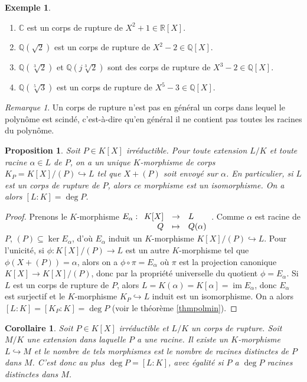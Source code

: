 \documentclass{article}
\newcommand{\Q}{\mathbb{Q}}
\newcommand{\R}{\mathbb{R}}
\newcommand{\C}{\mathbb{C}}
\DeclareMathOperator{\im}{im}
\newcommand{\applic}[4]{\begin{array}[t]{rcl}
#1 & \to & #2 \\
#3 & \mapsto & #4
\end{array}}
\renewcommand{\subset}{\subseteq}
\theoremstyle{plain}
\newtheorem{proposition}[theorem]{Proposition}
\newtheorem{corollary}[theorem]{Corollaire}
\theoremstyle{definition}
\newtheorem{example}[theorem]{Exemple}
\theoremstyle{remark}
\newtheorem*{remark}{Remarque}
\begin{document}
\begin{example} \leavevmode
    \begin{enumerate}
        \item $\C$ est un corps de rupture de $X^2 + 1 \in \R[X]$.
        \item $\Q(\sqrt{2})$ est un corps de rupture de $X^2 - 2 \in \Q[X]$.
        \item $\Q(\sqrt[3]{2})$ et $\Q(j\sqrt[3]{2})$ sont des corps de rupture de $X^3 - 2 \in \Q[X]$.
        \item $\Q(\sqrt[5]{3})$ est un corps de rupture de $X^5 - 3 \in \Q[X]$.
    \end{enumerate}
\end{example}

\begin{remark}
    Un corps de rupture n'est pas en général un corps dans lequel le polynôme est scindé, c'est-à-dire qu'en général il ne contient pas \og toutes \fg les racines du polynôme.
\end{remark}

\begin{proposition}
    Soit $P \in K[X]$ irréductible. Pour toute extension $L/K$ et toute racine $\alpha \in L$ de $P$, on a un unique $K$-morphisme de corps $K_P = K[X]/(P) \hookrightarrow L$ tel que $X + (P)$ soit envoyé sur $\alpha$. En particulier, si $L$ est un corps de rupture de $P$, alors ce morphisme est un isomorphisme. On a alors $[L : K] = \deg P$.
\end{proposition}

\begin{proof}
    Prenons le $K$-morphisme $E_\alpha : \applic{K[X]}{L}{Q}{Q(\alpha)}$. Comme $\alpha$ est racine de $P$, $(P) \subset \ker E_\alpha$, d'où $E_\alpha$ induit un $K$-morphisme $K[X]/(P) \hookrightarrow L$. Pour l'unicité, si $\phi : K[X]/(P) \to L$ est un autre $K$-morphisme tel que $\phi(X+(P)) = \alpha$, alors on a $\phi \circ \pi = E_\alpha$ où $\pi$ est la projection canonique $K[X] \to K[X]/(P)$, donc par la propriété universelle du quotient $\phi = E_\alpha$. Si $L$ est un corps de rupture de $P$, alors $L = K(\alpha) = K[\alpha] = \im E_\alpha$, donc $E_\alpha$ est surjectif et le $K$-morphisme $K_P \hookrightarrow L$ induit est un isomorphisme. On a alors $[L : K] = [K_P : K] = \deg P$ (voir le théorème \ref{thmpolmin}).
\end{proof}

\begin{corollary} \label{nbmorcorpsrupture}
    Soit $P \in K[X]$ irréductible et $L/K$ un corps de rupture. Soit $M/K$ une extension dans laquelle $P$ a une racine. Il existe un $K$-morphisme $L \hookrightarrow M$ et le nombre de tels morphismes est le nombre de racines distinctes de $P$ dans $M$. C'est donc au plus $\deg P = [L : K]$, avec égalité si $P$ a $\deg P$ racines distinctes dans $M$.
\end{corollary}
\end{document}
